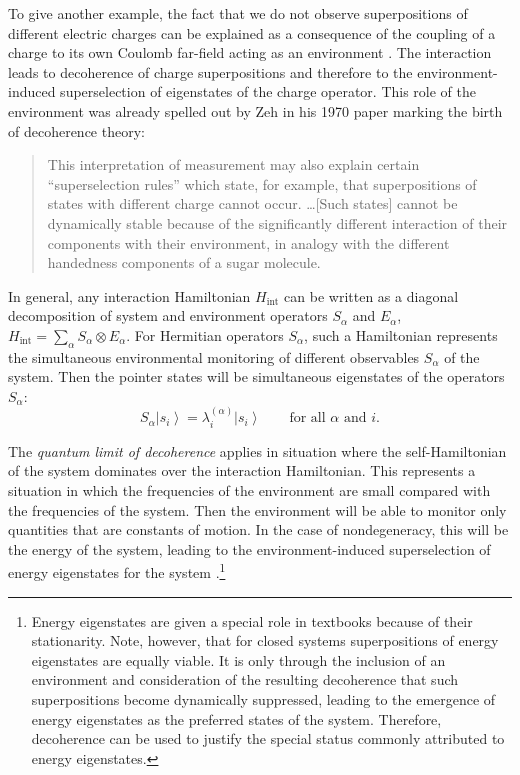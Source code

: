 \documentclass[3p,sort&compress]{elsarticle}
\newcommand{\ket}[1]{\left\vert{#1}\right\rangle}
\newcommand{\op}[1]{#1}
\begin{document}
To give another example, the fact that we do not observe superpositions of different electric charges can be explained as a consequence of the coupling of a charge to its own Coulomb far-field acting as an environment \cite{Zeh:1970:yt,Giulini:1995:zh,Giulini:2000:ry}. The interaction leads to decoherence of charge superpositions and therefore to the environment-induced superselection of eigenstates of the charge operator. This role of the environment was already spelled out by Zeh \cite{Zeh:1970:yt} in his 1970 paper marking the birth of decoherence theory:
%
\begin{quote}
This interpretation of measurement may also explain certain ``superselection rules'' which state, for example, that superpositions of states with different charge cannot occur. \dots [Such states] cannot be dynamically stable because of the significantly different interaction of their components with their environment, in analogy with the different handedness components of a sugar molecule.
\end{quote}
%

In general, any interaction Hamiltonian $\op{H}_\text{int}$ can be written as a diagonal decomposition of system and environment operators $\op{S}_\alpha$ and $\op{E}_\alpha$, $\op{H}_\text{int} =  \sum_\alpha \op{S}_\alpha \otimes \op{E}_\alpha$. For Hermitian operators $\op{S}_\alpha$, such a Hamiltonian represents the simultaneous environmental monitoring of different observables $\op{S}_\alpha$ of the system. Then the pointer states will be simultaneous eigenstates of the operators $\op{S}_\alpha$:
%
\begin{equation}
  \label{eq:OIbvsrhjkbv9}
  \op{S}_\alpha \ket{s_i} = \lambda_i^{(\alpha)}\ket{s_i} \qquad
  \text{for all $\alpha$ and $i$}. 
\end{equation}
% 

The \emph{quantum limit of decoherence} \cite{Paz:1999:vv} applies in situation where the self-Hamiltonian of the system dominates over the interaction Hamiltonian. This represents a situation in which the frequencies of the environment are small compared with the frequencies of the system. Then the environment will be able to monitor only quantities that are constants of motion. In the case of nondegeneracy, this will be the energy of the system, leading to the environment-induced superselection of energy eigenstates for the system \cite{Paz:1999:vv}.\footnote{Energy eigenstates are given a special role in textbooks because of their stationarity. Note, however, that for closed systems superpositions of energy eigenstates are equally viable. It is only through the inclusion of an environment and consideration of the resulting decoherence that such superpositions become dynamically suppressed, leading to the emergence of energy eigenstates as the preferred states of the system. Therefore, decoherence can be used to justify the special status commonly attributed to energy eigenstates.}
\end{document}
